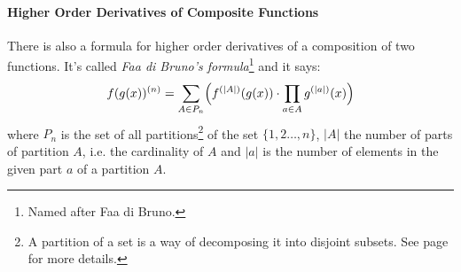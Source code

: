 




\paragraph{Higher Order Derivatives of Composite Functions}
There is also a formula for higher order derivatives of a composition of two functions. It's called \emph{Faa di Bruno's formula}\footnote{Named after Faa di Bruno.} and it says:
\begin{equation}
f(g(x))^{(n)} = 
\sum_{A \in P_n} 
\Bigl(
f^{(|A|)}(g(x)) \cdot \prod_{a \in A} g^{(|a|)}(x) 
\Bigr)
\end{equation}
where $P_n$ is the set of all partitions\footnote{A partition of a set is a way of decomposing it into disjoint subsets. See page \pageref{Sec:PartitionsOfSets} for more details.} of the set $\{1,2\ldots,n\}$, $|A|$ the number of parts of partition $A$, i.e. the cardinality of $A$ and $|a|$ is the number of elements in the given part $a$ of a partition $A$. 

